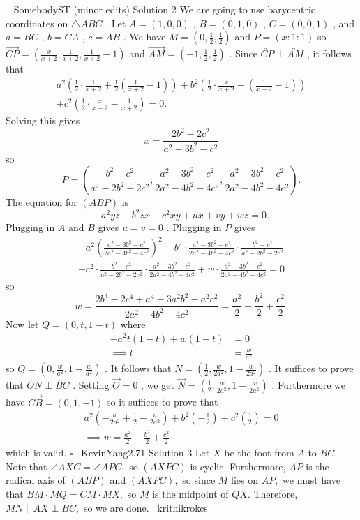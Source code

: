\documentclass[12pt]{article}
\begin{document}
~ SomebodyST (minor edits) Solution 2 We are going to use barycentric coordinates on $\triangle ABC$ . Let $A=(1,0,0)$ , $B=(0,1,0)$ , $C=(0,0,1)$ , and $a=BC$ , $b=CA$ , $c=AB$ . We have $M=\left(0,\frac{1}{2},\frac{1}{2}\right)$ and $P=(x:1:1)$ so $\overrightarrow{CP}=\left(\frac{x}{x+2},\frac{1}{x+2},\frac{1}{x+2}-1\right)$ and $\overrightarrow{AM}=\left(-1,\frac{1}{2},\frac{1}{2}\right)$ . Since $\overleftrightarrow{CP}\perp\overleftrightarrow{AM}$ , it follows that \begin{align*} a^2\left(\frac{1}{2}\cdot\frac{1}{x+2}+\frac{1}{2}\left(\frac{1}{x+2}-1\right)\right)+b^2\left(\frac{1}{2}\cdot\frac{x}{x+2}-\left(\frac{1}{x+2}-1\right)\right)\\ +c^2\left(\frac{1}{2}\cdot\frac{x}{x+2}-\frac{1}{x+2}\right)=0. \end{align*} Solving this gives \[ x=\frac{2b^2-2c^2}{a^2-3b^2-c^2} \] so \[ P=\left(\frac{b^2-c^2}{a^2-2b^2-2c^2},\frac{a^2-3b^2-c^2}{2a^2-4b^2-4c^2},\frac{a^2-3b^2-c^2}{2a^2-4b^2-4c^2}\right). \] The equation for $(ABP)$ is \[ -a^2yz-b^2zx-c^2xy+ux+vy+wz=0. \] Plugging in $A$ and $B$ gives $u=v=0$ . Plugging in $P$ gives \begin{align*} -a^2\left(\frac{a^2-3b^2-c^2}{2a^2-4b^2-4c^2}\right)^2-b^2\cdot\frac{a^2-3b^2-c^2}{2a^2-4b^2-4c^2}\cdot\frac{b^2-c^2}{a^2-2b^2-2c^2}\\ -c^2\cdot\frac{b^2-c^2}{a^2-2b^2-2c^2}\cdot\frac{a^2-3b^2-c^2}{2a^2-4b^2-4c^2}+w\cdot\frac{a^2-3b^2-c^2}{2a^2-4b^2-4c^2}=0 \end{align*} so \[ w=\frac{2b^4-2c^4+a^4-3a^2b^2-a^2c^2}{2a^2-4b^2-4c^2}=\frac{a^2}{2}-\frac{b^2}{2}+\frac{c^2}{2}. \] Now let $Q=(0,t,1-t)$ where \begin{align*} -a^2t(1-t)+w(1-t)&=0\\ \implies t&=\frac{w}{a^2} \end{align*} so $Q=\left(0,\frac{w}{a^2},1-\frac{w}{a^2}\right)$ . It follows that $N=\left(\frac{1}{2},\frac{w}{2a^2},1-\frac{w}{2a^2}\right)$ . It suffices to prove that $\overleftrightarrow{ON}\perp\overleftrightarrow{BC}$ . Setting $\overrightarrow{O}=0$ , we get $\overrightarrow{N}=\left(\frac{1}{2},\frac{w}{2a^2},1-\frac{w}{2a^2}\right)$ . Furthermore we have $\overrightarrow{CB}=(0,1,-1)$ so it suffices to prove that \begin{align*} a^2\left(-\frac{w}{2a^2}+\frac{1}{2}-\frac{u}{2a^2}\right)+b^2\left(-\frac{1}{2}\right)+c^2\left(\frac{1}{2}\right)=0\\ \implies w=\frac{a^2}{2}-\frac{b^2}{2}+\frac{c^2}{2} \end{align*} which is valid. $\square$ ~KevinYang2.71 Solution 3 Let $X$ be the foot from $A$ to $BC.$ Note that $\angle AXC=\angle APC,$ so $(AXPC)$ is cyclic. Furthermore, $AP$ is the radical axis of $(ABP)$ and $(AXPC),$ so since $M$ lies on $AP,$ we must have that $BM\cdot MQ=CM\cdot MX,$ so $M$ is the midpoint of $QX.$ Therefore, $MN\parallel AX\perp BC,$ so we are done.
~krithikrokcs
\end{document}
